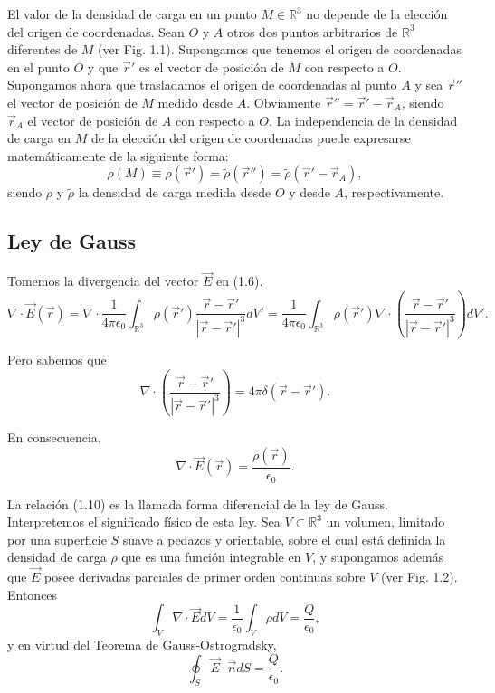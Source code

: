 \documentclass[12pt,a4paper]{book}
\begin{document}
El valor de la densidad de carga en un punto $M \in \mathbb{R}^3$ no depende de la elección del origen de coordenadas. Sean $O$ y $A$ otros dos puntos arbitrarios de $\mathbb{R}^3$ diferentes de $M$ (ver Fig. 1.1). Supongamos que tenemos el origen de coordenadas en el punto $O$ y que $\vec{r}'$ es el vector de posición de $M$ con respecto a $O$. Supongamos ahora que trasladamos el origen de coordenadas al punto $A$ y sea $\vec{r}''$ el vector de posición de $M$ medido desde $A$. Obviamente $\vec{r}'' = \vec{r}' - \vec{r}_A$, siendo $\vec{r}_A$ el vector de posición de $A$ con respecto a $O$. La independencia de la densidad de carga en $M$ de la elección del origen de coordenadas puede expresarse matemáticamente de la siguiente forma:
\begin{equation}
\rho(M) \equiv \rho(\vec{r}') = \tilde{\rho}(\vec{r}'') = \tilde{\rho}(\vec{r}' - \vec{r}_A),
\end{equation}
siendo $\rho$ y $\tilde{\rho}$ la densidad de carga medida desde $O$ y desde $A$, respectivamente.

\subsection{Ley de Gauss}

Tomemos la divergencia del vector $\vec{E}$ en (1.6).
\begin{equation}
\nabla \cdot \vec{E}(\vec{r}) = \nabla \cdot \frac{1}{4\pi\epsilon_0} \int_{\mathbb{R}^3} \rho(\vec{r}') \frac{\vec{r}-\vec{r}'}{|\vec{r}-\vec{r}'|^3}dV' = \frac{1}{4\pi\epsilon_0} \int_{\mathbb{R}^3} \rho(\vec{r}') \nabla \cdot \left( \frac{\vec{r}-\vec{r}'}{|\vec{r}-\vec{r}'|^3} \right) dV'.
\end{equation}

Pero sabemos que
\begin{equation}
\nabla \cdot \left( \frac{\vec{r}-\vec{r}'}{|\vec{r}-\vec{r}'|^3} \right) = 4\pi\delta(\vec{r} - \vec{r}').
\end{equation}

En consecuencia,
\begin{equation}
\nabla \cdot \vec{E}(\vec{r}) = \frac{\rho(\vec{r})}{\epsilon_0}.
\end{equation}

La relación (1.10) es la llamada forma diferencial de la ley de Gauss. Interpretemos el significado físico de esta ley. Sea $V \subset \mathbb{R}^3$ un volumen, limitado por una superficie $S$ suave a pedazos y orientable, sobre el cual está definida la densidad de carga $\rho$ que es una función integrable en $V$, y supongamos además que $\vec{E}$ posee derivadas parciales de primer orden continuas sobre $V$ (ver Fig. 1.2). Entonces
\begin{equation}
\int_V \nabla \cdot \vec{E}dV = \frac{1}{\epsilon_0}\int_V \rho dV = \frac{Q}{\epsilon_0},
\end{equation}
y en virtud del Teorema de Gauss-Ostrogradsky,
\begin{equation}
\oint_S \vec{E} \cdot \vec{n} dS = \frac{Q}{\epsilon_0}.
\end{equation}
\end{document}
